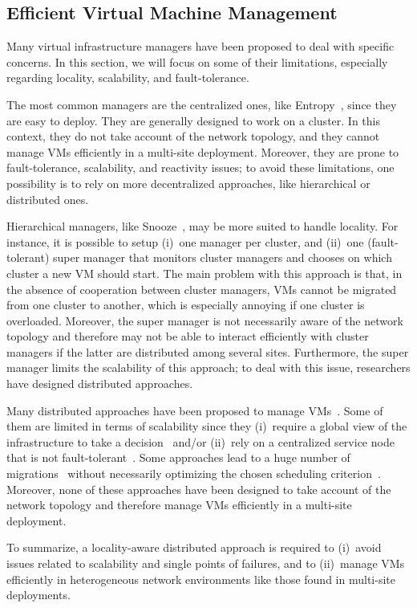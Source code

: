 
\subsection{Efficient Virtual Machine Management}

Many virtual infrastructure managers have been proposed to deal with specific concerns.
In this section, we will focus on some of their limitations, especially regarding
locality, scalability, and fault-tolerance.

The most common managers are the centralized ones, like
Entropy~\cite{hermenier:cp11,hermenier:2013}, since they are easy to deploy.
%
They are generally designed to work on a cluster.
%
In this context, they do not take account of the network topology, and they
cannot manage VMs efficiently in a multi-site deployment.
%
Moreover, they are prone to fault-tolerance, scalability, and reactivity issues; to avoid
these limitations, one possibility is to rely on more decentralized approaches, like
hierarchical or distributed ones.

Hierarchical managers, like Snooze~\cite{feller:ccgrid12}, may be more suited to handle
locality.
%
For instance, it is possible to setup (i)~one manager per cluster, and (ii)~one
(fault-tolerant) super manager that monitors cluster managers and chooses on which cluster
a new VM should start.
%
%
The main problem with this approach is that, in the absence of cooperation between cluster
managers, VMs cannot be migrated from one cluster to another, which is especially annoying
if one cluster is overloaded.
%
Moreover, the super manager is not necessarily aware of the network topology and therefore
may not be able to interact efficiently with cluster managers if the latter are
distributed among several sites.
%
Furthermore, the super manager limits the scalability of this approach; to deal with this
issue, researchers have designed distributed approaches.

Many distributed approaches have been proposed to manage
VMs~\cite{barbagallo:lncs10,feller:cloudcom12,marzolla:wowmom11,mastroianni:europar11,rouzaudcornabas:vhpc10,yazir:cloud10}.
%
Some of them are limited in terms of scalability since they (i)~require a global view of
the infrastructure to take a decision~\cite{rouzaudcornabas:vhpc10,yazir:cloud10} and/or
(ii)~rely on a centralized service node that is not
fault-tolerant~\cite{mastroianni:europar11,yazir:cloud10}.
%
Some approaches lead to a huge number of
migrations~\cite{barbagallo:lncs10,mastroianni:europar11} without necessarily optimizing
the chosen scheduling criterion~\cite{barbagallo:lncs10}.
%
Moreover, none of these approaches have been designed to take account of the network
topology and therefore manage VMs efficiently in a multi-site deployment.

To summarize, a locality-aware distributed approach is required to (i)~avoid issues
related to scalability and single points of failures, and to (ii)~manage VMs efficiently
in heterogeneous network environments like those found in multi-site deployments.
